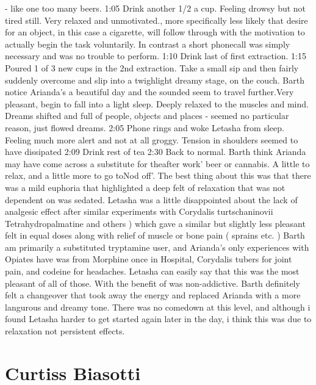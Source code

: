\documentclass[12pt]{book}
\begin{document}
- like one too many beers. 1:05 Drink another 1/2 a cup. Feeling drowsy but not tired still. Very relaxed and unmotivated., more specifically less likely that desire for an object, in this case a cigarette, will follow through with the motivation to actually begin the task voluntarily. In contrast a short phonecall was simply necessary and was no trouble to perform. 1:10 Drink last of first extraction. 1:15 Poured 1 of 3 new cups in the 2nd extraction. Take a small sip and then fairly suddenly overcome and slip into a twighlight dreamy stage, on the couch. Barth notice Arianda's a beautiful day and the sounded seem to travel further.Very pleasant, begin to fall into a light sleep. Deeply relaxed to the muscles and mind. Dreams shifted and full of people, objects and places - seemed no particular reason, just flowed dreams. 2:05 Phone rings and woke Letasha from sleep. Feeling much more alert and not at all groggy. Tension in shoulders seemed to have dissipated 2:09 Drink rest of tea 2:30 Back to normal. Barth think Arianda may have come across a substitute for theafter work' beer or cannabis. A little to relax, and a little more to go toNod off'. The best thing about this was that there was a mild euphoria that highlighted a deep felt of relaxation that was not dependent on was sedated. Letasha was a little disappointed about the lack of analgesic effect after similar experiments with Corydalis turtschaninovii Tetrahydropalmatine and others ) which gave a similar but slightly less pleasant felt in equal doses along with relief of muscle or bone pain ( sprains etc. ) Barth am primarily a substituted tryptamine user, and Arianda's only experiences with Opiates have was from Morphine once in Hospital, Corydalis tubers for joint pain, and codeine for headaches. Letasha can easily say that this was the most pleasant of all of those. With the benefit of was non-addictive. Barth definitely felt a changeover that took away the energy and replaced Arianda with a more langurous and dreamy tone. There was no comedown at this level, and although i found Letasha harder to get started again later in the day, i think this was due to relaxation not persistent effects.



\chapter{Curtiss Biasotti}
\end{document}
